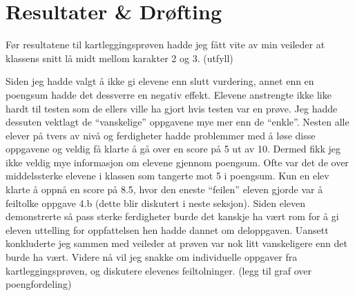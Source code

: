 \documentclass[main.tex]{subfiles}
\begin{document}
\section*{Resultater \& Drøfting}
\label{sec:4}

Før resultatene til kartleggingsprøven hadde jeg fått vite av min veileder at klassens snitt lå midt mellom
karakter 2 og 3. (utfyll)

Siden jeg hadde valgt å ikke gi elevene enn slutt vurdering, annet enn en poengsum hadde det dessverre en negativ effekt. Elevene anstrengte ikke like hardt til testen som de ellers ville ha gjort hvis testen var en prøve.
 Jeg hadde dessuten vektlagt de ``vanskelige'' oppgavene mye mer enn de 
``enkle''. Nesten alle elever på tvers av nivå og ferdigheter hadde 
problemmer med å løse disse oppgavene og veldig få klarte å gå over en score på 5 ut av 10. Dermed fikk jeg ikke 
veldig mye informasjon om elevene gjennom poengsum. Ofte var det de over middelssterke elevene i klassen som tangerte
mot 5 i poengsum. Kun en elev klarte å oppnå en score på 8.5, hvor den eneste ``feilen'' eleven gjorde var å
feiltolke oppgave 4.b (dette blir diskutert i neste seksjon). Siden eleven demonstrerte så pass sterke ferdigheter 
burde det kanskje ha vært rom for å gi eleven uttelling for oppfattelsen hen hadde dannet om deloppgaven. 
Uansett konkluderte jeg sammen med veileder at prøven var nok litt vanskeligere enn det burde ha vært. Videre nå vil 
jeg snakke om individuelle oppgaver fra kartleggingsprøven, og diskutere elevenes feiltolninger.
(legg til graf over poengfordeling)
\end{document}
